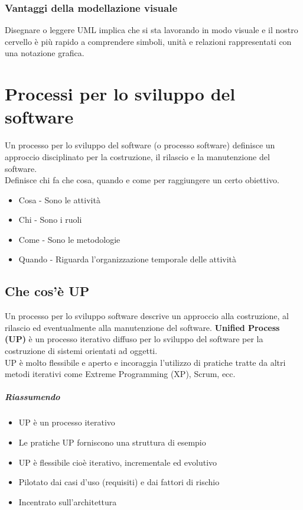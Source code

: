 \subsection{Vantaggi della modellazione visuale}
Disegnare o leggere UML implica che si sta lavorando in modo visuale e il nostro
cervello è più rapido a comprendere simboli, unità e relazioni rappresentati
con una notazione grafica.

\chapter{Processi per lo sviluppo del software}
Un processo per lo sviluppo del software (o processo software) definisce un approccio disciplinato
per la costruzione, il rilascio e la manutenzione del software.
\\ Definisce chi fa che cosa, quando e come per raggiungere un certo obiettivo.
\begin{itemize}
    \item Cosa - Sono le attività
    \item Chi - Sono i ruoli
    \item Come - Sono le metodologie
    \item Quando - Riguarda l'organizzazione temporale delle attività
\end{itemize}
\section{Che cos'è UP}
Un processo per lo sviluppo software descrive un approccio alla costruzione,
al rilascio ed eventualmente alla manutenzione del software. \textbf{Unified Process (UP)}
 è un processo iterativo diffuso per lo sviluppo del software per la costruzione di sistemi
 orientati ad oggetti.
 \\ UP è molto flessibile e aperto e incoraggia l'utilizzo di pratiche
 tratte da altri metodi iterativi come Extreme Programming (XP), Scrum, ecc.
 \paragraph{Riassumendo}
 \begin{itemize}
    \item UP è un processo iterativo
    \item Le pratiche UP forniscono una struttura di esempio
    \item UP è flessibile cioè iterativo, incrementale ed evolutivo
    \item Pilotato dai casi d'uso (requisiti) e dai fattori di rischio
    \item Incentrato sull'architettura
 \end{itemize}
